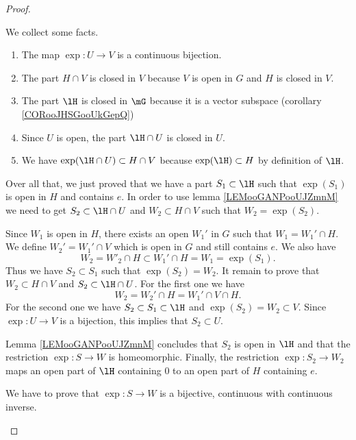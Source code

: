 \begin{proof}
\begin{subproof}

		We collect some facts.
		\begin{enumerate}
			\item
			      The map \(\exp \colon U\to V  \) is a continuous bijection.
			\item
			      The part \( H\cap V\) is closed in \( V\) because \( V\) is open in \( G\) and \( H\) is closed in \( V\).
			\item
			      The part \( \lH\) is closed in \( \mG\) because it is a vector subspace (corollary \ref{CORooJHSGooUkGepQ})
			\item
			      Since \( U\) is open, the part \( \lH\cap U\) is closed in \( U\).
			\item
			      We have \( \exp(\lH\cap U)\subset H\cap V\) because \( \exp(\lH)\subset H\) by definition of \( \lH\).
		\end{enumerate}
		Over all that, we just proved that we have a part \( S_1\subset \lH\) such that \( \exp(S_1)\) is open in \( H\) and contains \( e\). In order to use lemma \ref{LEMooGANPooUJZmnM} we need to get \( S_2\subset \lH\cap U\) and \( W_2\subset H\cap V\) such that \( W_2=\exp(S_2)\).

		Since \( W_1\) is open in \( H\), there exists an open \( W_1'\) in \( G\) such that \( W_1=W_1'\cap H\). We define \( W_2'=W_1'\cap V\) which is open in \( G\) and still contains \( e\). We also have
		\begin{equation}
			W_2=W'_2\cap H\subset W_1'\cap H=W_1=\exp(S_1).
		\end{equation}
		Thus we have \( S_2\subset S_1\) such that \( \exp(S_2)=W_2\). It remain to prove that \( W_2\subset H\cap V\) and \( S_2\subset \lH\cap U\). For the first one we have
		\begin{equation}
			W_2=W_2'\cap H=W_1'\cap V\cap H.
		\end{equation}
		For the second one we have \( S_2\subset S_1\subset \lH\) and \( \exp(S_2)=W_2\subset V\). Since \(\exp \colon U\to V   \) is  a bijection, this implies that \( S_2\subset U\).

		Lemma \ref{LEMooGANPooUJZmnM} concludes that \( S_2\) is open in \( \lH\) and that the restriction \(\exp \colon S\to W  \) is homeomorphic. Finally, the restriction \(\exp \colon S_2\to W_2  \) maps an open part of \( \lH\) containing \( 0\) to an open part of \( H\) containing \( e\).

		\spitem[Homeomorphism]
		We have to prove that \(\exp \colon S\to W  \) is a bijective, continuous with continuous inverse.
	\end{subproof}
\end{proof}



